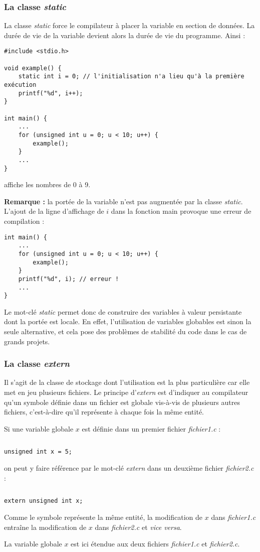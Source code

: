 \documentclass[../../../main.tex]{subfiles}
\begin{document}
\subsubsection{La classe \textit{static}}
\label{ssub:la_classe_static}
La classe \textit{static} force le compilateur à placer la variable en section de données. La durée de vie de la variable devient alors la durée de vie du programme. Ainsi :
\begin{verbatim}
#include <stdio.h>

void example() {
	static int i = 0; // l'initialisation n'a lieu qu'à la première exécution
	printf("%d", i++);
}

int main() {
	...
	for (unsigned int u = 0; u < 10; u++) {
		example();
	}
	...
}
\end{verbatim}
affiche les nombres de 0 à 9.

\textbf{Remarque :} la portée de la variable n'est pas augmentée par la classe \textit{static}. L'ajout de la ligne d'affichage de $i$ dans la fonction \textsf{main} provoque une erreur de compilation :
\begin{verbatim}
int main() {
	...
	for (unsigned int u = 0; u < 10; u++) {
		example();
	}
	printf("%d", i); // erreur !
	...
}
\end{verbatim}
Le mot-clé \textit{static} permet donc de construire des variables à valeur persistante dont la portée est locale. En effet, l'utilisation de variables globables est sinon la seule alternative, et cela pose des problèmes de stabilité du code dans le cas de grands projets.
\subsubsection{La classe \textit{extern}}
\label{ssub:la_classe_extern}
Il s'agit de la classe de stockage dont l'utilisation est la plus particulière car elle met en jeu plusieurs fichiers. Le principe d'\textit{extern} est d'indiquer au compilateur qu'un symbole définie dans un fichier est globale vis-à-vis de plusieurs autres fichiers, c'est-à-dire qu'il représente à chaque fois la même entité.

Si une variable globale $x$ est définie dans un premier fichier \textit{fichier1.c} :
\begin{lstlisting}[title=fichier1.c]
\end{lstlisting}
\begin{verbatim}
unsigned int x = 5;
\end{verbatim}
on peut y faire référence par le mot-clé \textit{extern} dans un deuxième fichier \textit{fichier2.c} :
\begin{lstlisting}[title=fichier2.c]
\end{lstlisting}
\begin{verbatim}
extern unsigned int x;
\end{verbatim}
Comme le symbole représente la même entité, la modification de $x$ dans \textit{fichier1.c} entraîne la modification de $x$ dans \textit{fichier2.c} et \textit{vice versa}.

La variable globale $x$ est ici étendue aux deux fichiers \textit{fichier1.c} et \textit{fichier2.c}.
\end{document}
